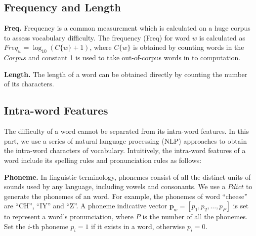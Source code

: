 \subsection{Frequency and Length}

\textbf{Freq.} Frequency is a common measurement which is calculated on a huge corpus to assess vocabulary difficulty.
The frequency (Freq) for word $w$ is calculated as $Freq_w=\log_{10}(C\{w\}+1)$,
where $C\{w\}$ is obtained by counting words in the $Corpus$ and constant 1 is used to take out-of-corpus words in to computation.
	
\textbf{Length. }The length of a word can be obtained directly by counting the number of its characters.

\subsection{Intra-word Features}
The difficulty of a word cannot be separated from its intra-word features.
In this part, we use a series of natural language processing (NLP) approaches to obtain the intra-word characters of vocabulary. 
Intuitively, the intra-word features of a word include its spelling rules and pronunciation rules as follows:

\textbf{Phoneme.} 
In linguistic terminology, phonemes consist of all the distinct units of sounds used by any language, including vowels and consonants.
We use a $Pdict$ to generate the phonemes of an word.
For example, the phonemes of word ``cheese'' are ``CH'', ``IY'' and ``Z''.
A phoneme indicative vector $\mathbf{p}_w=[p_1, p_2, \dots, p_P]$ is set to represent a word's pronunciation, where $P$ is the number of all the phonemes. Set the $i$-th phoneme $p_i=1$ if it exists in a word, otherwise $p_i=0$.

